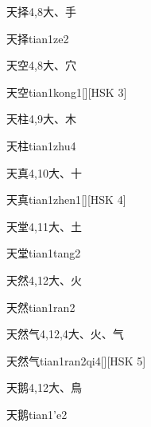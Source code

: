 \begin{entry}{天择}{4,8}{⼤、⼿}
  \begin{phonetics}{天择}{tian1ze2}
  \end{phonetics}
\end{entry}

\begin{entry}{天空}{4,8}{⼤、⽳}
  \begin{phonetics}{天空}{tian1kong1}[][HSK 3]
  \end{phonetics}
\end{entry}

\begin{entry}{天柱}{4,9}{⼤、⽊}
  \begin{phonetics}{天柱}{tian1zhu4}
  \end{phonetics}
\end{entry}

\begin{entry}{天真}{4,10}{⼤、⼗}
  \begin{phonetics}{天真}{tian1zhen1}[][HSK 4]
  \end{phonetics}
\end{entry}

\begin{entry}{天堂}{4,11}{⼤、⼟}
  \begin{phonetics}{天堂}{tian1tang2}
  \end{phonetics}
\end{entry}

\begin{entry}{天然}{4,12}{⼤、⽕}
  \begin{phonetics}{天然}{tian1ran2}
  \end{phonetics}
\end{entry}

\begin{entry}{天然气}{4,12,4}{⼤、⽕、⽓}
  \begin{phonetics}{天然气}{tian1ran2qi4}[][HSK 5]
  \end{phonetics}
\end{entry}

\begin{entry}{天鹅}{4,12}{⼤、⿃}
  \begin{phonetics}{天鹅}{tian1'e2}
  \end{phonetics}
\end{entry}

